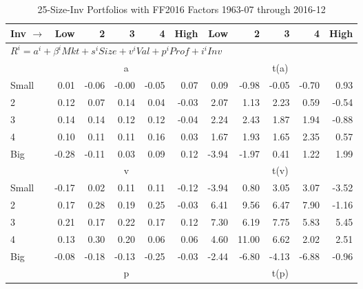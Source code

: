 
\begin{table}[!ht]
\centering
\caption{25-Size-Inv Portfolios with FF2016 Factors 1963-07 through 2016-12}
\begin{tabular}{lrrrrrrrrrr}
  \toprule
    Inv $\rightarrow$ & Low & 2 & 3 & 4 & High & Low & 2 & 3 & 4 & High \\ 
  \midrule
  \multicolumn{11}{l}{$R^i=a^i+\beta^iMkt+s^iSize+v^iVal+p^iProf+i^iInv$} \\

  
    
      & \multicolumn{5}{c}{a} & \multicolumn{5}{c}{t(a)}
    
    \\
      \cmidrule(r){2-6} \cmidrule(r){7-11}

    Small   & 0.01  & -0.06  & -0.00  & -0.05  & 0.07  & 0.09  & -0.98  & -0.05  & -0.70  & 0.93  \\
         2  & 0.12  & 0.07  & 0.14  & 0.04  & -0.03  & 2.07  & 1.13  & 2.23  & 0.59  & -0.54  \\
         3  & 0.14  & 0.14  & 0.12  & 0.12  & -0.04  & 2.24  & 2.43  & 1.87  & 1.94  & -0.88  \\
         4  & 0.10  & 0.11  & 0.11  & 0.16  & 0.03  & 1.67  & 1.93  & 1.65  & 2.35  & 0.57  \\
    Big     & -0.28  & -0.11  & 0.03  & 0.09  & 0.12  & -3.94  & -1.97  & 0.41  & 1.22  & 1.99  \\

  
    
      & \multicolumn{5}{c}{v} & \multicolumn{5}{c}{t(v)}
    
    \\
      \cmidrule(r){2-6} \cmidrule(r){7-11}

    Small   & -0.17  & 0.02  & 0.11  & 0.11  & -0.12  & -3.94  & 0.80  & 3.05  & 3.07  & -3.52  \\
         2  & 0.17  & 0.28  & 0.19  & 0.25  & -0.03  & 6.41  & 9.56  & 6.47  & 7.90  & -1.16  \\
         3  & 0.21  & 0.17  & 0.22  & 0.17  & 0.12  & 7.30  & 6.19  & 7.75  & 5.83  & 5.45  \\
         4  & 0.13  & 0.30  & 0.20  & 0.06  & 0.06  & 4.60  & 11.00  & 6.62  & 2.02  & 2.51  \\
    Big     & -0.08  & -0.18  & -0.13  & -0.25  & -0.03  & -2.44  & -6.80  & -4.13  & -6.88  & -0.96  \\

  
    
      & \multicolumn{5}{c}{p} & \multicolumn{5}{c}{t(p)}
    

\end{tabular}
\end{table}
